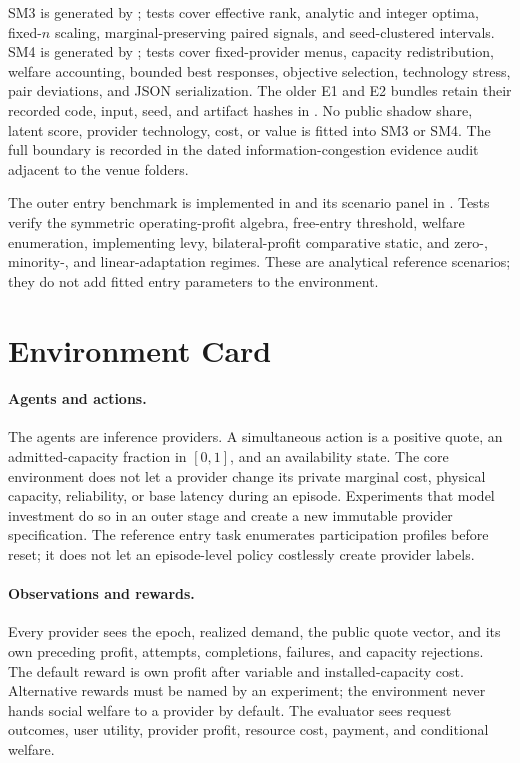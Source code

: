 \documentclass[10pt]{article}
\newcommand{\1}{\mathbf 1}
\begin{document}
SM3 is generated by
; tests cover effective
rank, analytic and integer optima, fixed-$n$ scaling, marginal-preserving paired
signals, and seed-clustered intervals.  SM4 is generated by
; tests cover
fixed-provider menus, capacity redistribution, welfare accounting, bounded best
responses, objective selection, technology stress, pair deviations, and JSON
serialization.  The older E1 and E2 bundles retain their recorded code, input,
seed, and artifact hashes in .  No
public shadow share, latent score, provider technology, cost, or value is fitted
into SM3 or SM4.  The full boundary is recorded in the dated
information-congestion evidence audit adjacent to the venue folders.

The outer entry benchmark is implemented in
 and its scenario panel in
.  Tests verify the
symmetric operating-profit algebra, free-entry threshold, welfare enumeration,
implementing levy, bilateral-profit comparative static, and zero-, minority-,
and linear-adaptation regimes.  These are analytical reference scenarios; they
do not add fitted entry parameters to the environment.

\section{Environment Card}

\paragraph{Agents and actions.}
The agents are inference providers.  A simultaneous action is a positive quote,
an admitted-capacity fraction in $[0,1]$, and an availability state.  The core
environment does not let a provider change its private marginal cost, physical
capacity, reliability, or base latency during an episode.  Experiments that model
investment do so in an outer stage and create a new immutable provider
specification.  The reference entry task enumerates participation profiles before
reset; it does not let an episode-level policy costlessly create provider labels.

\paragraph{Observations and rewards.}
Every provider sees the epoch, realized demand, the public quote vector, and its
own preceding profit, attempts, completions, failures, and capacity rejections.
The default reward is own profit after variable and installed-capacity cost.
Alternative rewards must be named by an experiment; the environment never hands
social welfare to a provider by default.  The evaluator sees request outcomes,
user utility, provider profit, resource cost, payment, and conditional welfare.
\end{document}
